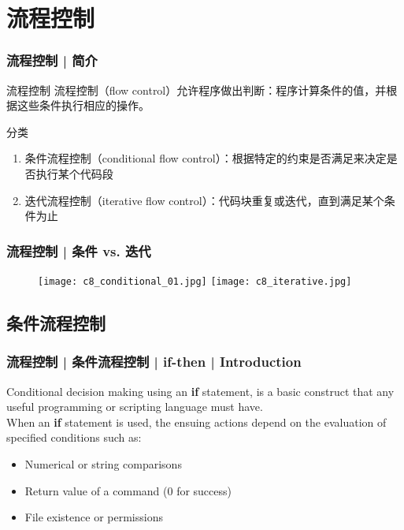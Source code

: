 \section{流程控制}
\begin{frame}
  \frametitle{流程控制 | 简介}
  \begin{block}{流程控制}
    流程控制（flow control）允许程序做出判断：程序计算条件的值，并根据这些条件执行相应的操作。
  \end{block}
  \pause
  \begin{block}{\alert{分类}}
    \begin{enumerate}
      \item 条件流程控制（conditional flow control）：根据特定的约束是否满足来决定是否执行某个代码段
      \item 迭代流程控制（iterative flow control）：代码块重复或迭代，直到满足某个条件为止
    \end{enumerate}
  \end{block}
\end{frame}

\begin{frame}
  \frametitle{流程控制 | 条件 vs. 迭代}
  \begin{figure}
    \centering
    \texttt{[image: c8\_conditional\_01.jpg]}
    \texttt{[image: c8\_iterative.jpg]}
  \end{figure}
\end{frame}

\subsection{条件流程控制}
\begin{frame}
  \frametitle{流程控制 | 条件流程控制 | if-then | Introduction}
  Conditional decision making using an \textbf{if} statement, is a basic
  construct that any useful programming or scripting language must
  have.\\
  \vspace{0.3cm}
  When an \textbf{if} statement is used, the ensuing actions depend on the evaluation of specified conditions such as:
  \begin{itemize}
    \item Numerical or string comparisons
    \item Return value of a command (0 for success)
    \item File existence or permissions
  \end{itemize}
\end{frame}


